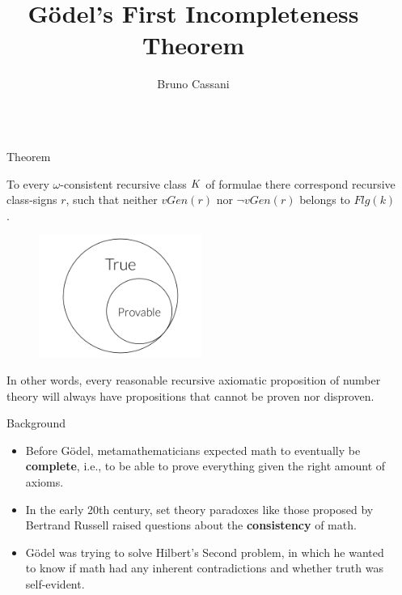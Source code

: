 \documentclass[final]{beamer}
\title{Gödel's First Incompleteness Theorem}
\author{Bruno Cassani}
\institute[shortinst]{\textbf{Morrissey College of Arts and Sciences}, Boston College}
\newlength{\sepwidth}
\newlength{\colwidth}
\newcommand{\separatorcolumn}{\begin{column}{\sepwidth}\end{column}}
\begin{document}
\begin{frame}[t]
\begin{columns}[t]
\separatorcolumn

\begin{column}{\colwidth}



  \begin{alertblock}{Theorem}

    To every $\omega$-consistent recursive class $\small{K}$ of formulae there correspond recursive class-signs $r$, such that neither $vGen(r)$ nor $\neg vGen(r)$ belongs to $Flg(k)$.

    \begin{figure}
      \centering
            \includegraphics[width=0.5\textwidth]{figures/Draw_1.png}
    \end{figure}

    In other words, every reasonable recursive axiomatic proposition of number theory will always have propositions that cannot be proven nor disproven.
    
  \end{alertblock}
  
\begin{block}{Background}

    \begin{itemize}
      \item Before Gödel, metamathematicians expected math to eventually be \textbf{complete}, i.e., to be able to prove everything given the right amount of axioms.
      \item In the early 20th century, set theory paradoxes like those proposed by Bertrand Russell raised questions about the \textbf{consistency} of math.
      \item Gödel was trying to solve Hilbert's Second problem, in which he wanted to know if math had any inherent contradictions and whether truth was self-evident.
        
    \end{itemize}


\end{block}
\end{column}
\end{columns}
\end{frame}
\end{document}
